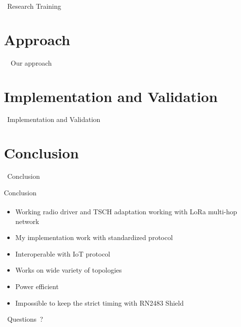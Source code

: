 \documentclass{beamer}
\begin{document}
{
\begin{frame}[c]{}
  \centering
  \LARGE
  \vubfont
  ~Research Training
\end{frame}
}



\section{Approach}

{
\begin{frame}[c]{}
  \centering
  \LARGE
  \vubfont
  ~~Our approach
\end{frame}
}



\section{Implementation and Validation}

{
\begin{frame}[c]{}
  \centering
  \LARGE
  \vubfont
  ~Implementation and Validation
\end{frame}
}



\section{Conclusion}

{
\begin{frame}[c]{}
  \centering
  \LARGE
  \vubfont
  ~Conclusion
\end{frame}
}

\begin{frame}{Conclusion}
\framesubtitle{}

\begin{itemize}
  \item Working radio driver and TSCH adaptation working with LoRa multi-hop
    network
  \item My implementation work with standardized protocol
  \item Interoperable with IoT protocol
  \item Works on wide variety of topologies
  \item Power efficient
  \item Impossible to keep the strict timing with RN2483 Shield
\end{itemize}
\end{frame}

{
\begin{frame}[c]{}
  \centering
  \LARGE
  \vubfont
  ~Questions~?
\end{frame}
}


\end{document}

